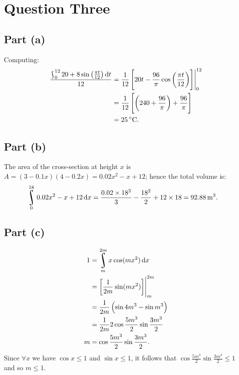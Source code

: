 \documentclass[a4paper]{report}
\DeclareMathOperator*{\rint}{\scalerel*{\rotatebox{17}{$\!\int\!$}}{\int}}
\begin{document}
\section*{Question Three}
\subsection*{Part (a)}
Computing:
\begin{align*}
  \frac{\rint^{12}_0 20 + 8\sin \left(\frac{\pi t}{12} \right) \dif{t}}{12}
     &= \frac{1}{12} \eval{\left[20t - \frac{96}{\pi} \cos\left(\frac{\pi t}{12}\right)\right]}_0^{12}\\
     &= \frac{1}{12} \left[\left(240 + \frac{96}{\pi}\right) + \frac{96}{\pi}\right]\\
     &= \SI{25}{\celsius}.
\end{align*}

\subsection*{Part (b)}
The area of the cross-section at height $ x $ is $ A = (3 - 0.1x)(4 - 0.2x) = 0.02x^2 - x + 12 $; hence the total volume is:
\begin{align*}
  \rint_0^{18} 0.02x^2 - x + 12 \dif{x} &= \frac{0.02 \times 18^3}{3} - \frac{18^2}{2} + 12 \times 18 = \SI{92.88}{\metre\cubed}.
\end{align*}

\subsection*{Part (c)}
\begin{align*}
  1 &= \rint^{2m}_m x \cos(mx^2) \dif{x}\\
    &= \eval{\left[\frac{1}{2m} \sin(mx^2)\right]}_m^{2m}\\
    &= \frac{1}{2m} \left( \sin 4m^3 - \sin m^3 \right)\\
    &= \frac{1}{2m} 2 \cos \frac{5m^3}{2} \sin \frac{3m^3}{2}\\
  m &= \cos \frac{5m^3}{2} \sin \frac{3m^3}{2}.
\end{align*}
Since $ \forall x $ we have $ \cos x \leq 1 $ and $ \sin x \leq 1 $, it follows that $ \cos \frac{5m^3}{2} \sin \frac{3m^3}{2} \leq 1 $ and
so $ m \leq 1 $.
\end{document}
